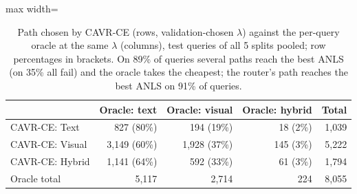 \begin{table}[t]
\centering
\caption{Path chosen by CAVR-CE (rows, validation-chosen $\lambda$) against the per-query oracle at the same $\lambda$ (columns), test queries of all 5 splits pooled; row percentages in brackets. On 89\% of queries several paths reach the best ANLS (on 35\% all fail) and the oracle takes the cheapest; the router's path reaches the best ANLS on 91\% of queries.}
\label{tab:confusion}
\begin{adjustbox}{max width=\linewidth}
\begin{tabular}{lrrrr}
\toprule
\textbf{} & \textbf{Oracle: text} & \textbf{Oracle: visual} & \textbf{Oracle: hybrid} & \textbf{Total} \\
\midrule
CAVR-CE: Text & 827 (80\%) & 194 (19\%) & 18 (2\%) & 1,039 \\
CAVR-CE: Visual & 3,149 (60\%) & 1,928 (37\%) & 145 (3\%) & 5,222 \\
CAVR-CE: Hybrid & 1,141 (64\%) & 592 (33\%) & 61 (3\%) & 1,794 \\
Oracle total & 5,117 & 2,714 & 224 & 8,055 \\
\bottomrule
\end{tabular}
\end{adjustbox}
\end{table}

